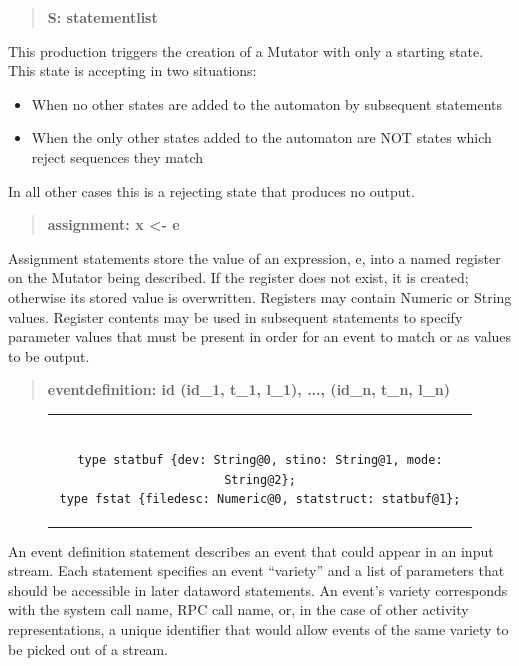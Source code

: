 \begin{quote}
\centering
\textbf{S: statementlist}
\end{quote}

This production triggers the creation of a Mutator with only a starting
state.  This state is accepting in two situations:
\begin{itemize}
  \item{When no other states are added to the automaton by subsequent
    statements}
  \item{When the only other states added to the automaton are NOT states
    which reject sequences they match}
\end{itemize}
In all other cases this is a rejecting state that produces no output.

\begin{quote}
\centering
\textbf{assignment: x <- e}
\end{quote}

Assignment statements store the value of an expression, e, into a named
register on the Mutator being described.
If the register does not exist,
it is created;
otherwise its stored value is overwritten.
Registers may contain Numeric or String values.  Register contents
may be used in subsequent statements to specify parameter values that must
be present in order for an event to match or as values to be output.

\begin{quote}
\centering
\textbf{eventdefinition: id (id\_1, t\_1, l\_1), ..., (id\_n, t\_n, l\_n) }
\end{quote}

\begin{figure}[H]
\centering
\begin{tabular}{c}
\begin{lstlisting}

type statbuf {dev: String@0, stino: String@1, mode: String@2};
type fstat {filedesc: Numeric@0, statstruct: statbuf@1};

\end{lstlisting}
\end{tabular}
\end{figure}

An event definition statement describes an event that could appear in an input
stream.  Each statement specifies an event ``variety'' and a list of
parameters that should be accessible in later dataword statements.
An event's variety corresponds
with the system call name, RPC call name, or, in the case of other activity
representations, a unique identifier that would allow events of the same
variety to be picked out of a stream.

